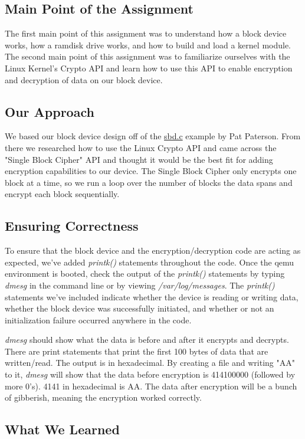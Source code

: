 \documentclass[draftclsnofoot, onecolumn, 10pt, compsoc]{IEEEtran}
\begin{document}
		\subsection{Main Point of the Assignment}
			The first main point of this assignment was to understand how a block device works, how a ramdisk drive works, and how to build and load a kernel module. The second main point of this assignment was to familiarize ourselves with the Linux Kernel's Crypto API and learn how to use this API to enable encryption and decryption of data on our block device.
		\subsection{Our Approach}
			We based our block device design off of the \href{http://blog.superpat.com/2010/05/04/a-simple-block-driver-for-linux-kernel-2-6-31/}{sbd.c} example by Pat Paterson. From there we researched how to use the Linux Crypto API and came across the "Single Block Cipher" API and thought it would be the best fit for adding encryption capabilities to our device. The Single Block Cipher only encrypts one block at a time, so we run a loop over the number of blocks the data spans and encrypt each block sequentially.
		\subsection{Ensuring Correctness}
			To ensure that the block device and the encryption/decryption code are acting as expected, we've added \textit{printk()} statements throughout the code. Once the qemu environment is booted, check the output of the \textit{printk()} statements by typing \textit{dmesg} in the command line or by viewing \textit{/var/log/messages}. The \textit{printk()} statements we've included indicate whether the device is reading or writing data, whether the block device was successfully initiated, and whether or not an initialization failure occurred anywhere in the code.
			
			\textit{dmesg} should show what the data is before and after it encrypts and decrypts.
			There are print statements that print the first 100 bytes of data that are written/read. 
			The output is in hexadecimal.
			By creating a file and writing "AA" to it, \textit{dmesg} will show that the data before encryption is 414100000 (followed by more 0's). 
			4141 in hexadecimal is AA.
			The data after encryption will be a bunch of gibberish, meaning the encryption worked correctly.
		\subsection{What We Learned}
\end{document}
